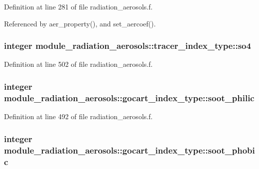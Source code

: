 Definition at line 281 of file radiation\+\_\+aerosols.\+f.



Referenced by aer\+\_\+property(), and set\+\_\+aercoef().

\subsubsection[{\texorpdfstring{so4}{so4}}]{\setlength{\rightskip}{0pt plus 5cm}integer module\+\_\+radiation\+\_\+aerosols\+::tracer\+\_\+index\+\_\+type\+::so4\hspace{0.3cm}{\ttfamily [private]}}\hypertarget{group__module__radiation__aerosols_gaa73b4be9d303cfce2c00407204c5f930}{}\label{group__module__radiation__aerosols_gaa73b4be9d303cfce2c00407204c5f930}


Definition at line 502 of file radiation\+\_\+aerosols.\+f.

\subsubsection[{\texorpdfstring{soot\+\_\+philic}{soot_philic}}]{\setlength{\rightskip}{0pt plus 5cm}integer module\+\_\+radiation\+\_\+aerosols\+::gocart\+\_\+index\+\_\+type\+::soot\+\_\+philic\hspace{0.3cm}{\ttfamily [private]}}\hypertarget{group__module__radiation__aerosols_gac382ab82531e2f1cb6021b786666f004}{}\label{group__module__radiation__aerosols_gac382ab82531e2f1cb6021b786666f004}


Definition at line 492 of file radiation\+\_\+aerosols.\+f.

\subsubsection[{\texorpdfstring{soot\+\_\+phobic}{soot_phobic}}]{\setlength{\rightskip}{0pt plus 5cm}integer module\+\_\+radiation\+\_\+aerosols\+::gocart\+\_\+index\+\_\+type\+::soot\+\_\+phobic\hspace{0.3cm}{\ttfamily [private]}}\hypertarget{group__module__radiation__aerosols_gabe87221aca998b4d7ca231525e7dc355}{}\label{group__module__radiation__aerosols_gabe87221aca998b4d7ca231525e7dc355}


